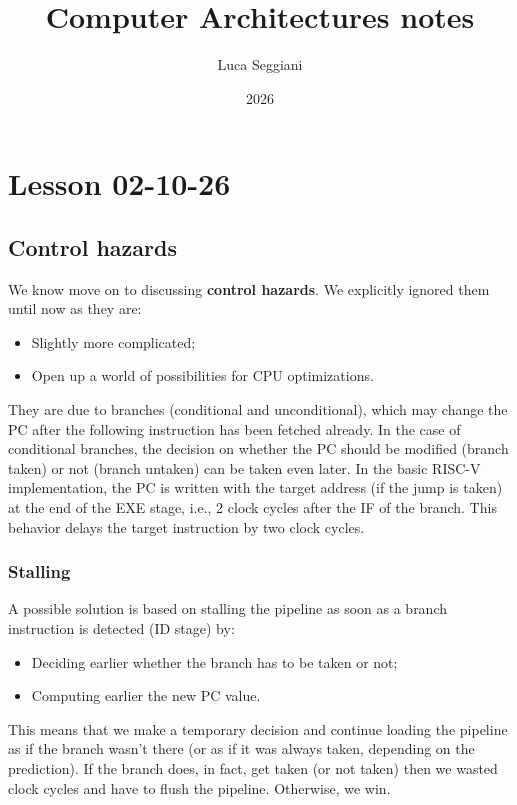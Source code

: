 \documentclass[a4paper,11pt]{article}
\title{Computer Architectures notes}
\author{Luca Seggiani}
\date{2026}
\begin{document}
\section{Lesson 02-10-26}

\thispagestyle{empty}
\pagestyle{fancy}

\subsection{Control hazards}

We know move on to discussing \textbf{control hazards}.
We explicitly ignored them until now as they are:
\begin{itemize}
	\item Slightly more complicated;
	\item Open up a world of possibilities for CPU optimizations.
\end{itemize}

They are due to branches (conditional and unconditional), which may change the PC after the following instruction has been fetched already.
In the case of conditional branches, the decision on whether the PC should be modified (branch taken) or not (branch untaken) can be taken even later.
In the basic RISC-V implementation, the PC is written with the target address (if the jump is taken) at the end of the EXE stage, i.e., 2 clock cycles after the IF of the branch.
This behavior delays the target instruction by two clock cycles.

\subsubsection{Stalling}

A possible solution is based on stalling the pipeline as soon as a branch instruction is detected (ID stage) by:
\begin{itemize}
	\item Deciding earlier whether the branch has to be taken or not;
	\item Computing earlier the new PC value.
\end{itemize}

This means that we make a temporary decision and continue loading the pipeline as if the branch wasn't there (or as if it was always taken, depending on the prediction).
If the branch does, in fact, get taken (or not taken) then we wasted clock cycles and have to flush the pipeline.
Otherwise, we win.
\end{document}

